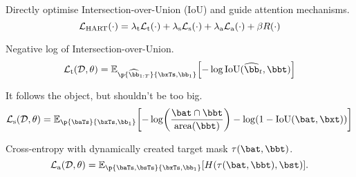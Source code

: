 \vspace{.5\baselineskip}
    \centering
    Directly optimise Intersection-over-Union (IoU) and guide attention mechanisms.
\begin{equation*}
\loss[\mathrm{HART}]{\cdot} = \lambda_{\mathrm{t}} \loss[\mathrm{t}]{\cdot} + \lambda_{\mathrm{s}} \loss[\mathrm{s}]{\cdot} + \lambda_{\mathrm{a}} \loss[\mathrm{a}]{\cdot} + \beta \reg{ \cdot }
\end{equation*}

\begin{description}[leftmargin=\parindent,labelsep=1em]

\item[Tracking:] Negative log of Intersection-over-Union.
\begin{equation*}
    \loss[\mathrm{t}]{\data, \theta} = \expc[\p{\widehat{\bb}_{1:T}}{\bxTs, \bb_1}]{ -\log \mathrm{IoU} \fences{\widehat{\bb}_t, \bbt}}
\end{equation*}

\item[Spatial Attention:] It follows the object, but shouldn't be too big.
\begin{equation*}
    \loss[\mathrm{s}]{\data, \theta} = \expc[\p{\baTs}{\bxTs, \bb_1}]{ -\log \fences*{\frac{ \bat \cap \bbt }{\mathrm{area}\fences{\bbt}} } -\log \fences { 1 - \mathrm{IoU} \fences{\bat, \bxt} } }
\end{equation*}

\item[Appearance Attention:] Cross-entropy with dynamically created target mask $\tau \fences { \bat, \bbt }$.
\begin{equation*}
    \loss[\mathrm{a}]{\data, \theta} =   \expc[\p{\baTs, \bsTs}{\bxTs, \bb_1}]{ H \fences{ \tau \fences { \bat, \bbt }, \bst  } }.
\end{equation*}

%
\end{description}

